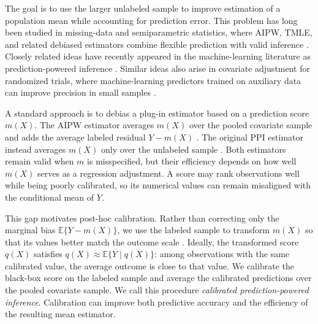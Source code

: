 \documentclass{article}
\theoremstyle{plain}
\theoremstyle{definition}
\newcommand{\E}{\mathbb{E}}
\newcommand{\1}{\mathbf{1}}
\begin{document}
The goal is to use the larger unlabeled sample to improve estimation of a
population mean while accounting for prediction error. This problem has long
been studied in missing-data and semiparametric statistics, where AIPW, TMLE,
and related debiased estimators combine flexible prediction with valid inference
\citep{robins1994estimation,vanderlaanunified,van2006targeted,
vanderLaanRose2011,DoubleML}. Closely related ideas have recently appeared in
the machine-learning literature as prediction-powered inference
\citep{ppi2023,angelopoulos2023ppi,crossppi2024}. Similar ideas also arise in
covariate adjustment for randomized trials, where machine-learning predictors
trained on auxiliary data can improve precision in small samples
\citep{hansen2008prognostic,rubin2008empirical,moore2009covariate,
lin2013agnostic,schuler2022increasing,balzer2024adaptive,hojbjerre2025powering}.

A standard approach is to debias a plug-in estimator based on a prediction score
\(m(X)\). The AIPW estimator averages \(m(X)\) over the pooled covariate sample
and adds the average labeled residual \(Y-m(X)\)
\citep{robins1994estimation}. The original PPI estimator instead averages
\(m(X)\) only over the unlabeled sample \citep{ppi2023}. Both estimators remain
valid when \(m\) is misspecified, but their efficiency depends on how well
\(m(X)\) serves as a regression adjustment. A score may rank observations well
while being poorly calibrated, so its numerical values can remain misaligned
with the conditional mean of \(Y\).

This gap motivates post-hoc calibration. Rather than correcting only the
marginal bias \(\E\{Y-m(X)\}\), we use the labeled sample to transform \(m(X)\)
so that its values better match the outcome scale
\citep{zadrozny2001obtaining,zadrozny2002transforming,niculescu2005predicting}.
Ideally, the transformed score \(q(X)\) satisfies
\(q(X)\approx \E\{Y\mid q(X)\}\): among observations with
the same calibrated value, the average outcome is close to that value. We
calibrate the black-box score on the labeled sample and average the calibrated
predictions over the pooled covariate sample. We call this procedure
\emph{calibrated prediction-powered inference}. Calibration can improve both
predictive accuracy and the efficiency of the resulting mean estimator.
\end{document}
